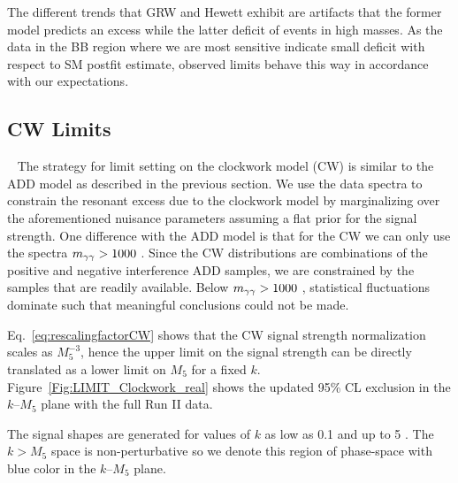 The different trends that GRW and Hewett exhibit are artifacts that the former model predicts an excess while the latter deficit of events in high masses. As the data in the BB region where we are most sensitive indicate small deficit with respect to SM postfit estimate, observed limits behave this way in accordance with our expectations. 



\subsection{CW Limits}~\label{sec:CWlimits}
The strategy for limit setting on the clockwork model (CW) is similar to the ADD model as described in the previous section. We use the data \mgg spectra to constrain the resonant excess due to the clockwork model by marginalizing over the aforementioned nuisance parameters assuming a flat prior for the signal strength. One difference with the ADD model is that for the CW we can only use the spectra $m_{\gamma\gamma}>1000$ \GeV. Since the CW distributions are combinations of the positive and negative interference ADD samples, we are constrained by the samples that are readily available. Below $m_{\gamma\gamma}>1000$ \GeV, statistical fluctuations dominate such that meaningful conclusions could not be made. 

Eq.~\ref{eq:rescalingfactorCW} shows that the CW signal strength normalization scales as  $M_5^{-3}$, hence the upper limit on the signal strength can be directly translated as a lower limit on $M_5$ for a fixed $k$.  Figure~\ref{Fig:LIMIT_Clockwork_real} shows the updated 95\% CL exclusion in the $k$--$M_5$ plane with the full Run II data.

The signal shapes are generated for values of $k$ as low as 0.1 \GeV and up to 5 \TeV. The $k>M_5$ space is non-perturbative so we denote this region of phase-space with blue color in the $k$--$M_5$ plane.

